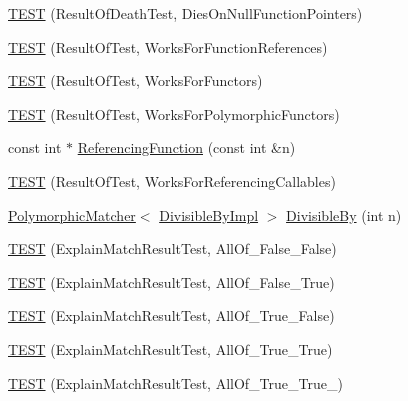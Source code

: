 \begin{DoxyCompactItemize}
\item 
\hyperlink{namespacetesting_1_1gmock__matchers__test_a4c929e5b46a503a9bb48c8b88dcbbf2a}{T\+E\+ST} (Result\+Of\+Death\+Test, Dies\+On\+Null\+Function\+Pointers)
\item 
\hyperlink{namespacetesting_1_1gmock__matchers__test_a1638ee6460100cbe21c65b6cdc06579a}{T\+E\+ST} (Result\+Of\+Test, Works\+For\+Function\+References)
\item 
\hyperlink{namespacetesting_1_1gmock__matchers__test_a19b7a39915f7ad5a0b741caf7ae4e619}{T\+E\+ST} (Result\+Of\+Test, Works\+For\+Functors)
\item 
\hyperlink{namespacetesting_1_1gmock__matchers__test_a976290e53e319b06c51a94f7e450d765}{T\+E\+ST} (Result\+Of\+Test, Works\+For\+Polymorphic\+Functors)
\item 
const int $\ast$ \hyperlink{namespacetesting_1_1gmock__matchers__test_af3164fc302e0b727c1eb745bdeb959f6}{Referencing\+Function} (const int \&n)
\item 
\hyperlink{namespacetesting_1_1gmock__matchers__test_a00ee08657c9e9e0c306be7b84cd2848c}{T\+E\+ST} (Result\+Of\+Test, Works\+For\+Referencing\+Callables)
\item 
\hyperlink{classtesting_1_1_polymorphic_matcher}{Polymorphic\+Matcher}$<$ \hyperlink{classtesting_1_1gmock__matchers__test_1_1_divisible_by_impl}{Divisible\+By\+Impl} $>$ \hyperlink{namespacetesting_1_1gmock__matchers__test_ac5b1fd3b6a8141c7e83ef6040ed4630f}{Divisible\+By} (int n)
\item 
\hyperlink{namespacetesting_1_1gmock__matchers__test_aa9a60a406d9f495de8c8552abf577dd1}{T\+E\+ST} (Explain\+Match\+Result\+Test, All\+Of\+\_\+\+False\+\_\+\+False)
\item 
\hyperlink{namespacetesting_1_1gmock__matchers__test_a099aebb5417d5bd85e11aefe935ec345}{T\+E\+ST} (Explain\+Match\+Result\+Test, All\+Of\+\_\+\+False\+\_\+\+True)
\item 
\hyperlink{namespacetesting_1_1gmock__matchers__test_a5d386691eaed59994a1d2b65f94b23a9}{T\+E\+ST} (Explain\+Match\+Result\+Test, All\+Of\+\_\+\+True\+\_\+\+False)
\item 
\hyperlink{namespacetesting_1_1gmock__matchers__test_a16545b298640b253502d604f52ea95e2}{T\+E\+ST} (Explain\+Match\+Result\+Test, All\+Of\+\_\+\+True\+\_\+\+True)
\item 
\hyperlink{namespacetesting_1_1gmock__matchers__test_af1ba4010a24716a51a302f9a518023b5}{T\+E\+ST} (Explain\+Match\+Result\+Test, All\+Of\+\_\+\+True\+\_\+\+True\+\_)
\item 

\end{DoxyCompactItemize}
